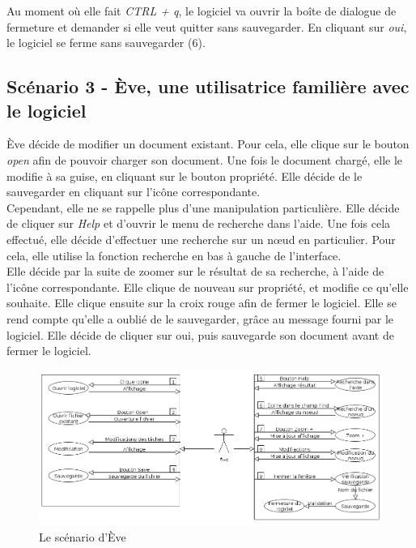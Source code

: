 \documentclass[12pt, a4paper]{article}
\begin{document}
Au moment où elle fait \emph{CTRL + q}, le logiciel va ouvrir la boîte de dialogue de fermeture et demander si elle veut quitter sans sauvegarder. En cliquant sur \emph{oui}, le logiciel se ferme sans sauvegarder (6).


\textcolor{NavyBlue}{\subsection{Scénario 3 - Ève, une utilisatrice familière avec le logiciel}}


Ève décide de modifier un document existant. Pour cela, elle clique sur le bouton \emph{open} afin de pouvoir charger son document. Une fois le document chargé, elle le modifie à sa guise, en cliquant sur le bouton propriété. Elle décide de le sauvegarder en cliquant sur l'icône correspondante.\\


Cependant, elle ne se rappelle plus d'une manipulation particulière. Elle décide de cliquer sur \emph{Help} et d'ouvrir le menu de recherche dans l'aide. Une fois cela effectué, elle décide d’effectuer une recherche sur un nœud en particulier. Pour cela, elle utilise la fonction recherche en bas à gauche de l'interface. \\


Elle décide par la suite de zoomer sur le résultat de sa recherche, à l'aide de l'icône correspondante. Elle clique de nouveau sur propriété, et modifie ce qu'elle souhaite. Elle clique ensuite sur la croix rouge afin de fermer le logiciel. Elle se rend compte qu'elle a oublié de le sauvegarder, grâce au message fourni par le logiciel. Elle décide de cliquer sur oui, puis sauvegarde son document avant de fermer le logiciel.

\begin{figure}[h]
\begin{center}
   \includegraphics[scale = 0.47]{scenario-eve.png}
	\caption{Le scénario d'Ève}
	\end{center}
\end{figure}
\end{document}
